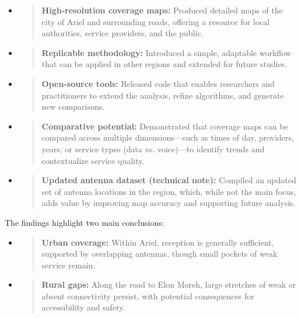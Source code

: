 \documentclass[11pt]{article}
\begin{document}
\begin{itemize}
\item
  \begin{quote}
  \textbf{High-resolution coverage maps:} Produced detailed maps of the
  city of Ariel and surrounding roads, offering a resource for local
  authorities, service providers, and the public.
  \end{quote}
\item
  \begin{quote}
  \textbf{Replicable methodology:} Introduced a simple, adaptable
  workflow that can be applied in other regions and extended for future
  studies.
  \end{quote}
\item
  \begin{quote}
  \textbf{Open-source tools:} Released code that enables researchers and
  practitioners to extend the analysis, refine algorithms, and generate
  new comparisons.
  \end{quote}
\item
  \begin{quote}
  \textbf{Comparative potential:} Demonstrated that coverage maps can be
  compared across multiple dimensions---such as times of day, providers,
  years, or service types (data vs. voice)---to identify trends and
  contextualize service quality.
  \end{quote}
\item
  \begin{quote}
  \textbf{Updated antenna dataset (technical note):} Compiled an updated
  set of antenna locations in the region, which, while not the main
  focus, adds value by improving map accuracy and supporting future
  analysis.
  \end{quote}
\end{itemize}

The findings highlight two main conclusions:

\begin{itemize}
\item
  \begin{quote}
  \textbf{Urban coverage:} Within Ariel, reception is generally
  sufficient, supported by overlapping antennas, though small pockets of
  weak service remain.
  \end{quote}
\item
  \begin{quote}
  \textbf{Rural gaps:} Along the road to Elon Moreh, large stretches of
  weak or absent connectivity persist, with potential consequences for
  accessibility and safety.
  \end{quote}
\end{itemize}
\end{document}
